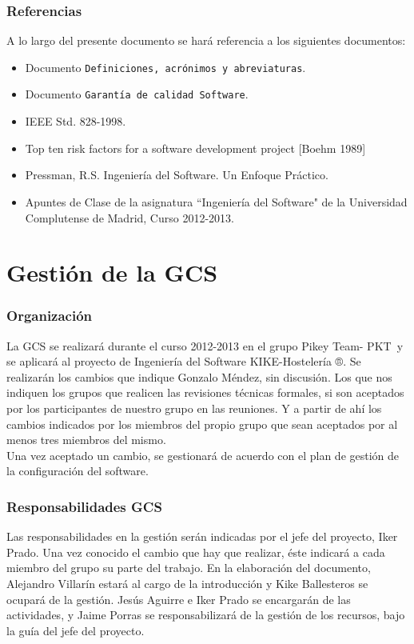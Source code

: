 \documentclass[spanish,a4paper,11pt, twoside]{report}	%
\newcommand*{\PKT}{\hbox{P}\kern-2.5pt\lower3.5pt\hbox{\small{K}}\kern-2.8pt\hbox{T}\kern-2pt}	%
\begin{document}
	\section{Referencias} A lo largo del presente documento se hará referencia a los siguientes documentos:
	\begin{itemize}
		\item Documento \texttt{Definiciones, acrónimos y abreviaturas}.
		\item Documento \texttt{Garantía de calidad Software}.
		\item IEEE Std. 828-1998.
		\item Top ten risk factors for a software development project [Boehm 1989] 
		\item Pressman, R.S. Ingeniería del Software. Un Enfoque Práctico.
		\item Apuntes de Clase de la asignatura “Ingeniería del Software" de la Universidad Complutense de Madrid, Curso 2012-2013.

	\end{itemize}

\setcounter{section}{0}

\part{Gestión de la GCS }

	\section{Organización}
	La GCS se realizará durante el curso 2012-2013 en el grupo Pikey Team- \PKT \  y se aplicará al proyecto de Ingeniería del Software KIKE-Hostelería ®. Se realizarán  los cambios que indique Gonzalo Méndez, sin discusión. Los que nos indiquen
	los grupos que realicen las revisiones técnicas formales, si son aceptados por los participantes de nuestro grupo en las reuniones. Y a partir de ahí  los cambios indicados por los miembros del propio grupo que sean aceptados por al menos tres miembros del mismo.\\
	Una vez aceptado un cambio, se gestionará de acuerdo con el plan de gestión de la configuración del software.
	\section{Responsabilidades GCS}
	Las responsabilidades en la gestión serán indicadas por el jefe del proyecto, Iker Prado. Una vez conocido el cambio que hay que realizar, éste indicará a cada miembro del grupo su parte del trabajo. En la elaboración del documento,
	Alejandro Villarín estará al cargo de la introducción y  Kike Ballesteros se ocupará de la gestión. Jesús Aguirre e Iker Prado se encargarán de las actividades,  y Jaime Porras se responsabilizará de la gestión de los recursos, bajo la guía del jefe del proyecto.
\end{document}
